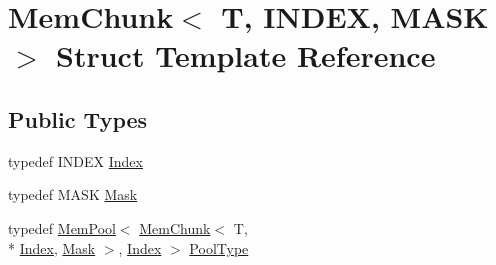 \hypertarget{structMemChunk}{\section{Mem\-Chunk$<$ T, I\-N\-D\-E\-X, M\-A\-S\-K $>$ Struct Template Reference}
\label{structMemChunk}
}
\subsection*{Public Types}
\begin{DoxyCompactItemize}
\item 
typedef I\-N\-D\-E\-X \hyperlink{structMemChunk_a8fd5e130634e3d9ea4084153b2a242c8}{Index}
\item 
typedef M\-A\-S\-K \hyperlink{structMemChunk_aee69d5019f70b5b3b7196a60b80fb3ac}{Mask}
\item 
typedef \hyperlink{structMemPool}{Mem\-Pool}$<$ \hyperlink{structMemChunk}{Mem\-Chunk}$<$ T, \\*
\hyperlink{structMemChunk_a8fd5e130634e3d9ea4084153b2a242c8}{Index}, \hyperlink{structMemChunk_aee69d5019f70b5b3b7196a60b80fb3ac}{Mask} $>$, \hyperlink{structMemChunk_a8fd5e130634e3d9ea4084153b2a242c8}{Index} $>$ \hyperlink{structMemChunk_a88683909c81aefbc29e3542d99482545}{Pool\-Type}
\end{DoxyCompactItemize}
